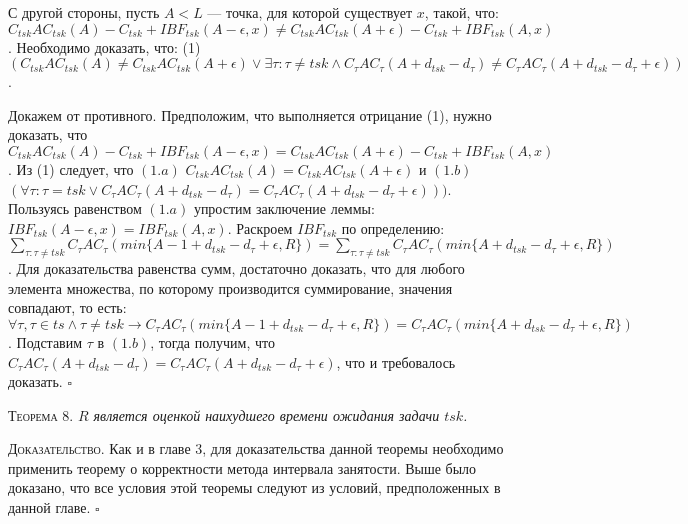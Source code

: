   С другой стороны, пусть $A < L$ --- точка, для которой существует $x$, такой, что:
   $C_{tsk}AC_{tsk}(A) - C_{tsk} + IBF_{tsk}(A - \epsilon, x) \neq C_{tsk}AC_{tsk}(A + \epsilon) -  C_{tsk} + IBF_{tsk}(A,x)$.
  Необходимо доказать, что:
    (1) $(C_{tsk}AC_{tsk}(A) \neq C_{tsk}AC_{tsk}(A + \epsilon)
          \vee \exists \tau: \tau \neq tsk \wedge C_{\tau}AC_{\tau}(A + d_{tsk} - d_{\tau}) \neq
                                                  C_{\tau}AC_{\tau}(A + d_{tsk} - d_{\tau} + \epsilon))$.

  Докажем от противного. Предположим, что выполняется отрицание (1),
    нужно доказать, что
    $C_{tsk}AC_{tsk}(A) - C_{tsk} + IBF_{tsk}(A - \epsilon, x) = C_{tsk}AC_{tsk}(A + \epsilon) - C_{tsk} + IBF_{tsk}(A,x)$.
  Из (1) следует, что $(1.a)$ $C_{tsk}AC_{tsk}(A) = C_{tsk}AC_{tsk}(A + \epsilon)$
    и $(1.b)$ $(\forall \tau: \tau = tsk \vee C_{\tau}AC_{\tau}(A + d_{tsk} - d_{\tau})
              = C_{\tau}AC_{\tau}(A + d_{tsk} - d_{\tau} + \epsilon)))$.
  Пользуясь равенством $(1.a)$ упростим заключение леммы: $ IBF_{tsk}(A - \epsilon, x) = IBF_{tsk}(A,x)$.
  Раскроем $IBF_{tsk}$ по определению:
    $\sum_{\tau:\tau \neq tsk} C_{\tau}AC_{\tau}( min\{A - 1 + d_{tsk} - d_{\tau} + \epsilon, R\} ) =
     \sum_{\tau:\tau \neq tsk} C_{\tau}AC_{\tau}( min\{A + d_{tsk} - d_{\tau} + \epsilon, R\} )$.
  Для доказательства равенства сумм, достаточно доказать, что для любого элемента множества, по
    которому производится суммирование, значения совпадают, то есть:
  $\forall \tau, \tau \in ts \wedge \tau \neq tsk \rightarrow
     C_{\tau}AC_{\tau}( min\{A - 1 + d_{tsk} - d_{\tau} + \epsilon, R\}) =
     C_{\tau}AC_{\tau}( min\{A + d_{tsk} - d_{\tau} + \epsilon, R\})$.
  Подставим $\tau$ в $(1.b)$, тогда получим, что
    $C_{\tau}AC_{\tau}(A + d_{tsk} - d_{\tau}) = C_{\tau}AC_{\tau}(A + d_{tsk} - d_{\tau} + \epsilon)$,
    что и требовалось доказать. $\square$

\textsc{Теорема 8.}
\textit{$R$ является оценкой наихудшего времени ожидания задачи $tsk$. }

\textsc{Доказательство.}
  Как и в главе 3, для доказательства данной теоремы необходимо применить теорему о корректности метода
    интервала занятости. Выше было доказано, что все условия этой теоремы следуют
    из условий, предположенных в данной главе.
$\square$

